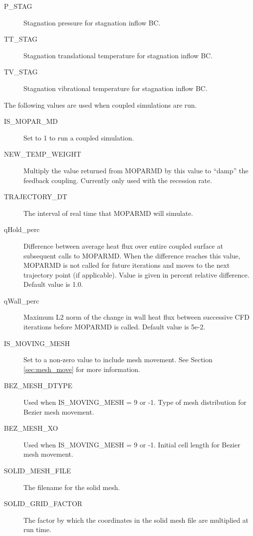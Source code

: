 \documentclass[]{article}
\begin{document}
\begin{description}
 \item [P\_STAG] Stagnation pressure for stagnation inflow BC.
 \item [TT\_STAG] Stagnation translational temperature for stagnation inflow BC.
 \item [TV\_STAG] Stagnation vibrational temperature for stagnation inflow BC.
\end{description}

\noindent The following values are used when coupled simulations are run.
\begin{description}
\item[IS\_MOPAR\_MD] Set to 1 to run a coupled simulation.
\item[NEW\_TEMP\_WEIGHT] Multiply the value returned from MOPARMD by this value to ``damp'' the feedback coupling.  Currently only used with the recession rate.
\item[TRAJECTORY\_DT] The interval of real time that MOPARMD will simulate.  
\item[qHold\_perc] Difference between average heat flux over entire coupled surface at subsequent calls to MOPARMD.  When the difference reaches this value, MOPARMD is not called for future iterations and moves to the next trajectory point (if applicable).  Value is given in percent relative difference. Default value is 1.0.   
\item[qWall\_perc] Maximum L2 norm of the change in wall heat flux between successive CFD iterations before MOPARMD is called. Default value is 5e-2.
\item[IS\_MOVING\_MESH] Set to a non-zero value to include mesh movement.  See Section \ref{sec:mesh_move} for more information.
\item[BEZ\_MESH\_DTYPE] Used when IS\_MOVING\_MESH = 9 or -1.   Type of mesh distribution for Bezier mesh movement.
\item[BEZ\_MESH\_XO] Used when IS\_MOVING\_MESH = 9 or -1.  Initial cell length for Bezier mesh movement.
\item[SOLID\_MESH\_FILE] The filename for the solid mesh.
\item[SOLID\_GRID\_FACTOR] The factor by which the coordinates in the solid mesh file are multiplied at run time.
\end{description}
\end{document}
